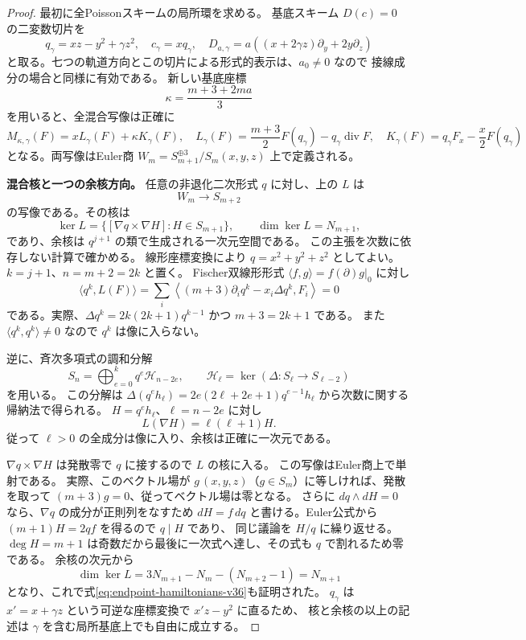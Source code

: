 \begin{proof}
最初に全Poissonスキームの局所環を求める。
基底スキーム $D(c)=0$ の二変数切片を
\[
 q_\gamma=xz-y^2+\gamma z^2,\quad
 c_\gamma=xq_\gamma,\quad
 D_{a,\gamma}=a((x+2\gamma z)\partial_y+2y\partial_z)
\]
と取る。七つの軌道方向とこの切片による形式的表示は、$a_0\ne0$ なので
接線成分の場合と同様に有効である。
新しい基底座標
\[
 \kappa=\frac{m+3+2ma}{3}
\]
を用いると、全混合写像は正確に
\begin{equation}
\label{eq:endpoint-mixed-v36}
 M_{\kappa,\gamma}(F)
 =xL_\gamma(F)+\kappa K_\gamma(F),
 \quad
 L_\gamma(F)=\frac{m+3}{2}F(q_\gamma)
                 -q_\gamma\operatorname{div}F,
 \quad
 K_\gamma(F)=q_\gamma F_x-\frac x2F(q_\gamma)
\end{equation}
となる。両写像はEuler商
$W_m=S_{m+1}^{\oplus3}/S_m(x,y,z)$ 上で定義される。

\medskip\noindent
\textbf{混合核と一つの余核方向。}
任意の非退化二次形式 $q$ に対し、上の $L$ は
\[
 W_m\longrightarrow S_{m+2}
\]
の写像である。その核は
\begin{equation}
\label{eq:endpoint-hamiltonians-v36}
 \ker L=\{[\nabla q\times\nabla H]:H\in S_{m+1}\},
 \qquad \dim\ker L=N_{m+1},
\end{equation}
であり、余核は $q^{j+1}$ の類で生成される一次元空間である。
この主張を次数に依存しない計算で確かめる。
線形座標変換により $q=x^2+y^2+z^2$ としてよい。
$k=j+1$、$n=m+2=2k$ と置く。
Fischer双線形形式 $\langle f,g\rangle=f(\partial)g|_0$ に対し
\[
 \langle q^k,L(F)\rangle
 =\sum_i\left\langle
 (m+3)\partial_i q^k-x_i\Delta q^k,F_i\right\rangle=0
\]
である。実際、$\Delta q^k=2k(2k+1)q^{k-1}$ かつ $m+3=2k+1$ である。
また $\langle q^k,q^k\rangle\ne0$ なので $q^k$ は像に入らない。

逆に、斉次多項式の調和分解
\[
 S_n=\bigoplus_{e=0}^{k}q^e\mathcal H_{n-2e},
 \qquad \mathcal H_\ell=\ker(\Delta:S_\ell\to S_{\ell-2})
\]
を用いる。
この分解は
$\Delta(q^e h_\ell)=2e(2\ell+2e+1)q^{e-1}h_\ell$
から次数に関する帰納法で得られる。
$H=q^e h_\ell$、$\ell=n-2e$ に対し
\[
 L(\nabla H)=\ell(\ell+1)H.
\]
従って $\ell>0$ の全成分は像に入り、余核は正確に一次元である。

$\nabla q\times\nabla H$ は発散零で $q$ に接するので $L$ の核に入る。
この写像はEuler商上で単射である。
実際、このベクトル場が $g\,(x,y,z)$（$g\in S_m$）に等しければ、発散を取って
$(m+3)g=0$、従ってベクトル場は零となる。
さらに $dq\wedge dH=0$ なら、$\nabla q$ の成分が正則列をなすため
$dH=f\,dq$ と書ける。Euler公式から $(m+1)H=2qf$ を得るので $q\mid H$ であり、
同じ議論を $H/q$ に繰り返せる。
$\deg H=m+1$ は奇数だから最後に一次式へ達し、その式も $q$ で割れるため零である。
余核の次元から
\[
 \dim\ker L
 =3N_{m+1}-N_m-(N_{m+2}-1)=N_{m+1}
\]
となり、これで式\eqref{eq:endpoint-hamiltonians-v36}も証明された。
$q_\gamma$ は $x'=x+\gamma z$ という可逆な座標変換で $x'z-y^2$ に直るため、
核と余核の以上の記述は $\gamma$ を含む局所基底上でも自由に成立する。


\end{proof}
